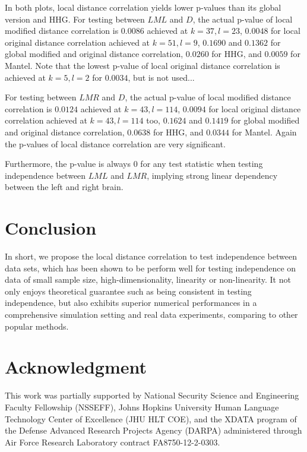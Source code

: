 \documentclass[11pt]{article}
\begin{document}
In both plots, local distance correlation yields lower p-values than its global version and HHG. For testing between $LML$ and $D$, the actual p-value of local modified distance correlation is $0.0086$ achieved at $k=37,l=23$, $0.0048$ for local original distance correlation achieved at $k=51,l=9$, $0.1690$ and $0.1362$ for global modified and original distance correlation, $0.0260$ for HHG, and $0.0059$ for Mantel. Note that the lowest p-value of local original distance correlation is achieved at $k=5,l=2$ for $0.0034$, but is not used...

For testing between $LMR$ and $D$, the actual p-value of local modified distance correlation is $0.0124$ achieved at $k=43,l=114$, $0.0094$ for local original distance correlation achieved at $k=43,l=114$ too, $0.1624$ and $0.1419$ for global modified and original distance correlation, $0.0638$ for HHG, and $0.0344$ for Mantel. Again the p-values of local distance correlation are very significant.

Furthermore, the p-value is always $0$ for any test statistic when testing independence between $LML$ and $LMR$, implying strong linear dependency between the left and right brain.


\section{Conclusion}
\label{conclu}
In short, we propose the local distance correlation to test independence between data sets, which has been shown to be perform well for testing independence on data of small sample size, high-dimensionality, linearity or non-linearity. It not only enjoys theoretical guarantee such as being consistent in testing independence, but also exhibits superior numerical performances in a comprehensive simulation setting and real data experiments, comparing to other popular methods.

\section*{Acknowledgment}
This work was partially supported by National Security Science and Engineering Faculty Fellowship (NSSEFF),
 Johns Hopkins University Human Language Technology Center of Excellence (JHU HLT COE), and the
 XDATA program of the Defense Advanced Research Projects Agency (DARPA) administered through Air Force Research Laboratory contract FA8750-12-2-0303.
\end{document}
